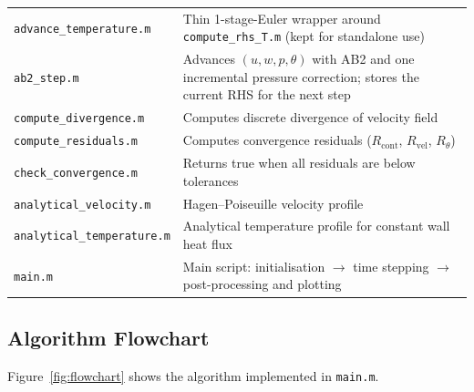 \documentclass[12pt,a4paper]{article}
\begin{document}
\begin{table}[H]
\begin{tabular}{lp{8.5cm}}
\texttt{advance\_temperature.m} & Thin 1-stage-Euler wrapper around \texttt{compute\_rhs\_T.m} (kept for standalone use) \\
\texttt{ab2\_step.m}          & Advances $(u,w,p,\theta)$ with AB2 and one incremental pressure correction; stores the current RHS for the next step \\
\texttt{compute\_divergence.m}   & Computes discrete divergence of velocity field \\
\texttt{compute\_residuals.m}    & Computes convergence residuals ($R_{\text{cont}}$, $R_{\text{vel}}$, $R_{\theta}$) \\
\texttt{check\_convergence.m}    & Returns true when all residuals are below tolerances \\
\texttt{analytical\_velocity.m}  & Hagen--Poiseuille velocity profile \\
\texttt{analytical\_temperature.m} & Analytical temperature profile for constant wall heat flux \\
\texttt{main.m}               & Main script: initialisation $\to$ time stepping $\to$ post-processing and plotting \\
\bottomrule
\end{tabular}
\end{table}

\subsection{Algorithm Flowchart}

Figure~\ref{fig:flowchart} shows the algorithm implemented in \texttt{main.m}.
\end{document}
